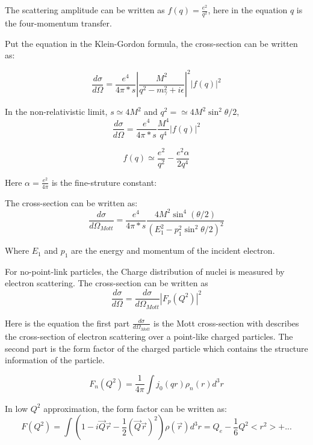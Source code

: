 The scattering amplitude can be written as $f(q) = \frac{e^2}{q^2}$, here in the equation $q$ is the four-momentum transfer.

Put the equation in the Klein-Gordon formula, the cross-section can be written as:

\begin{equation}
     \frac{d\sigma}{d\Omega} = \frac{e^4}{4\pi*s}|\frac{M^2}{q^2 - m^2_\gamma + i\epsilon}|^2|f(q)|^2
\end{equation}

In the non-relativistic limit, $s \simeq 4M^2$ and $q^2 = \simeq 4M^2 \sin^2{\theta/2}$, 
\begin{equation}
    \frac{d\sigma}{d\Omega} = \frac{e^4}{4\pi*s} \frac{M^4}{q^4}|f(q)|^2
\end{equation}

\begin{equation}
    f(q) \simeq \frac{e^2}{q^2} - \frac{e^2\alpha}{2q^4}
\end{equation}

Here $\alpha = \frac{e^2}{4\pi}$ is the fine-struture constant:

The cross-section can be written as:
\begin{equation}
      \frac{d\sigma}{d\Omega_{Mott}} =   \frac{e^4}{4\pi*s} \frac{4M^2\sin^4{(\theta/2)}}{(E_1^2 - p_1^2\sin^2{\theta/2})^2}
\end{equation}

Where $E_1$ and $p_1$ are the energy and momentum of the incident electron. 


For no-point-link particles, the Charge distribution of nuclei is measured by electron scattering. The cross-section can be written as
\begin{equation}
    \frac{d\sigma}{d\Omega} = \frac{d\sigma}{d\Omega_{Mott}}|F_p(Q^2)|^2
\end{equation}

Here is the equation the first part $\frac{d\sigma}{d\Omega_{Mott}}$ is the Mott cross-section with describes the cross-section of electron scattering over a point-like charged particles. The second part is the form factor of the charged particle which contains the structure information of the particle. 


\begin{equation}
    F_n(Q^2) = \frac{1}{4\pi}\int{j_0(qr)\rho_n(r)}d^3r
\end{equation}

In low $Q^2$ approximation, the form factor can be written as:
\begin{equation}
    F(Q^2) = \int{(1-i\Vec{Q}\Vec{r} - \frac{1}{2}(\Vec{Q}\Vec{r})^2)\rho(\Vec{r})}d^3r = Q_e - \frac{1}{6}Q^2<r^2> + ...
\end{equation}

